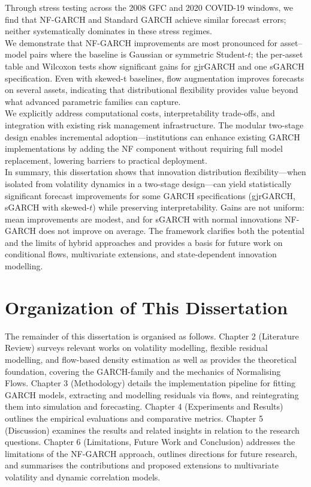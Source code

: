 \documentclass[oneside,12pt]{CUEDthesisPSnPDF}
\begin{document}
Through stress testing across the 2008 GFC and 2020 COVID-19 windows, we find that NF-GARCH and Standard GARCH achieve similar forecast errors; neither systematically dominates in these stress regimes.\\
    
We demonstrate that NF-GARCH improvements are most pronounced for asset--model pairs where the baseline is Gaussian or symmetric Student-$t$; the per-asset table and Wilcoxon tests show significant gains for gjrGARCH and one sGARCH specification. Even with skewed-t baselines, flow augmentation improves forecasts on several assets, indicating that distributional flexibility provides value beyond what advanced parametric families can capture.\\
    
We explicitly address computational costs, interpretability trade-offs, and integration with existing risk management infrastructure. The modular two-stage design enables incremental adoption—institutions can enhance existing GARCH implementations by adding the NF component without requiring full model replacement, lowering barriers to practical deployment.\\
    
In summary, this dissertation shows that innovation distribution flexibility—when isolated from volatility dynamics in a two-stage design—can yield statistically significant forecast improvements for some GARCH specifications (gjrGARCH, sGARCH with skewed-$t$) while preserving interpretability. Gains are not uniform: mean improvements are modest, and for sGARCH with normal innovations NF-GARCH does not improve on average. The framework clarifies both the potential and the limits of hybrid approaches and provides a basis for future work on conditional flows, multivariate extensions, and state-dependent innovation modelling.\\


\section{Organization of This Dissertation}
\noindent
The remainder of this dissertation is organised as follows. Chapter 2 (Literature Review) surveys relevant works on volatility modelling, flexible residual modelling, and flow-based density estimation as well as provides the theoretical foundation, covering the GARCH-family and the mechanics of Normalising Flows. Chapter 3 (Methodology) details the implementation pipeline for fitting GARCH models, extracting and modelling residuals via flows, and reintegrating them into simulation and forecasting. Chapter 4 (Experiments and Results) outlines the empirical evaluations and comparative metrics. Chapter 5 (Discussion) examines the results and related insights in relation to the research questions. Chapter 6 (Limitations, Future Work and Conclusion) addresses the limitations of the NF-GARCH approach, outlines directions for future research, and summarises the contributions and proposed extensions to multivariate volatility and dynamic correlation models.\\
\end{document}
